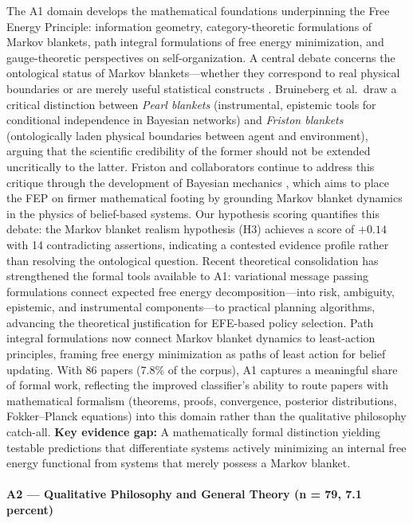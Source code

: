 \documentclass[
  english,
]{article}
\begin{document}
The A1 domain develops the mathematical foundations underpinning the
Free Energy Principle: information geometry, category-theoretic
formulations of Markov blankets, path integral formulations of free
energy minimization, and gauge-theoretic perspectives on
self-organization. A central debate concerns the ontological status of
Markov blankets---whether they correspond to real physical boundaries or
are merely useful statistical constructs \citep{bruineberg2022emperor}.
Bruineberg et al.~draw a critical distinction between \emph{Pearl
blankets} (instrumental, epistemic tools for conditional independence in
Bayesian networks) and \emph{Friston blankets} (ontologically laden
physical boundaries between agent and environment), arguing that the
scientific credibility of the former should not be extended uncritically
to the latter. Friston and collaborators continue to address this
critique through the development of Bayesian mechanics
\citep{sakthivadivel2023bayesian}, which aims to place the FEP on firmer
mathematical footing by grounding Markov blanket dynamics in the physics
of belief-based systems. Our hypothesis scoring quantifies this debate:
the Markov blanket realism hypothesis (H3) achieves a score of \(+0.14\)
with 14 contradicting assertions, indicating a contested evidence
profile rather than resolving the ontological question. Recent
theoretical consolidation has strengthened the formal tools available to
A1: variational message passing formulations
\citep{champion2021realizing} connect expected free energy
decomposition---into risk, ambiguity, epistemic, and instrumental
components---to practical planning algorithms, advancing the theoretical
justification for EFE-based policy selection. Path integral formulations
now connect Markov blanket dynamics to least-action principles, framing
free energy minimization as paths of least action for belief updating.
With 86 papers (7.8\% of the corpus), A1 captures a meaningful share of
formal work, reflecting the improved classifier's ability to route
papers with mathematical formalism (theorems, proofs, convergence,
posterior distributions, Fokker--Planck equations) into this domain
rather than the qualitative philosophy catch-all. \textbf{Key evidence
gap:} A mathematically formal distinction yielding testable predictions
that differentiate systems actively minimizing an internal free energy
functional from systems that merely possess a Markov blanket.

\paragraph{A2 --- Qualitative Philosophy and General Theory (n = 79, 7.1
percent)}\label{a2-qualitative-philosophy-and-general-theory-n-79-7.1-percent}
\end{document}
